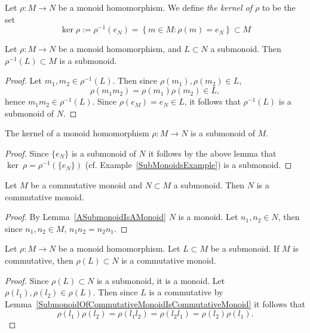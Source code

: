 \begin{definition}
    Let $\rho: M\rightarrow N$ be a monoid homomorphism. We define \textit{the kernel of $\rho$} to be the set 
    $$\ker \rho := \rho^{-1}(e_N) =\left\{ m\in M : \rho(m) = e_N\right\}\subset M$$
\end{definition}
\begin{lemma}\label{MonoidHomomorphismPreImageOfSubmonoidIsSubmonoid}
    Let $\rho: M\rightarrow N$ be a monoid homomorphism, and $L\subset N$ a submonoid. Then $\rho^{-1}(L)\subset M$ is a submonoid. 
\end{lemma}
\begin{proof}
    Let $m_1,m_2\in \rho^{-1}(L)$. Then since $\rho(m_1),\rho(m_2)\in L$,
    $$\rho(m_1m_2)=\rho(m_1)\rho(m_2)\in L,$$
    hence $m_1m_2\in \rho^{-1}(L)$. Since $\rho(e_M)=e_N \in L$, it follows that $\rho^{-1}(L)$ is a submonoid of $N$.
\end{proof}
\begin{corollary}\label{MonoidHomomorphismKernelIsSubmonoid}
    The kernel of a monoid homomorphism $\rho: M\rightarrow N$ is a submonoid of $M$.
\end{corollary}
\begin{proof}
    Since $\{e_N\}$ is a submonoid of $N$ it follows by the above lemma that $\ker\ \rho = \rho^{-1}(\{e_N\})$ (cf. Example~\ref{SubMonoidsExample}) is a submonoid.
\end{proof}
\begin{lemma}\label{SubmonoidOfCommutativeMonoidIsCommutativeMonoid}
    Let $M$ be a commutative monoid and $N\subset M$ a submonoid. Then $N$ is a commutative monoid.
\end{lemma}
\begin{proof}
    By Lemma~\ref{ASubmonoidIsAMonoid} $N$ is a monoid. Let $n_1,n_2\in N$, then since $n_1,n_2\in M$, $n_1n_2= n_2n_1$. 
\end{proof}
\begin{lemma}
    Let $\rho : M \rightarrow N$ be a monoid homomorphism. Let $L\subset M$ be a submonoid. If $M$ is commutative, then $\rho(L)\subset N$ is a commutative monoid. 
\end{lemma}
\begin{proof}
    Since $\rho(L)\subset N$ is a submonoid, it is a monoid. Let $\rho(l_1),\rho(l_2)\in \rho(L)$. Then since $L$ is a commutative by Lemma~\ref{SubmonoidOfCommutativeMonoidIsCommutativeMonoid} it follows that  
    $$\rho(l_1)\rho(l_2) = \rho(l_1l_2) = \rho(l_2l_1) = \rho(l_2)\rho(l_1).$$
\end{proof}
